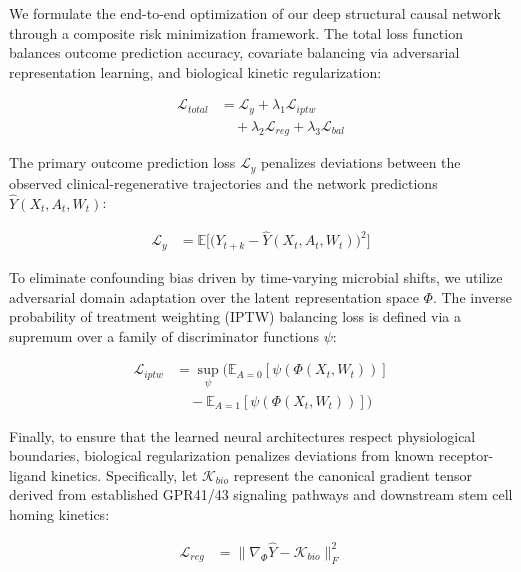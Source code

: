 \documentclass[10pt,twocolumn]{article}
\begin{document}
We formulate the end-to-end optimization of our deep structural causal network through a composite risk minimization framework. The total loss function balances outcome prediction accuracy, covariate balancing via adversarial representation learning, and biological kinetic regularization:

\begin{equation}
\begin{aligned}
\mathcal{L}_{total} &= \mathcal{L}_{y} + \lambda_1 \mathcal{L}_{iptw} \\
&\quad + \lambda_2 \mathcal{L}_{reg} + \lambda_3 \mathcal{L}_{bal}
\end{aligned}
\end{equation}

The primary outcome prediction loss $\mathcal{L}_{y}$ penalizes deviations between the observed clinical-regenerative trajectories and the network predictions $\hat{Y}(X_t, A_t, W_t)$:

\begin{equation}
\begin{aligned}
\mathcal{L}_{y} &= \mathbb{E} \Big[ \Big( Y_{t+k} - \hat{Y}(X_t, A_t, W_t) \Big)^2 \Big]
\end{aligned}
\end{equation}

To eliminate confounding bias driven by time-varying microbial shifts, we utilize adversarial domain adaptation over the latent representation space $\Phi$. The inverse probability of treatment weighting (IPTW) balancing loss is defined via a supremum over a family of discriminator functions $\psi$:

\begin{equation}
\begin{aligned}
\mathcal{L}_{iptw} &= \sup_{\psi} \Big( \mathbb{E}_{A=0} [\psi(\Phi(X_t, W_t))] \\
&\quad - \mathbb{E}_{A=1} [\psi(\Phi(X_t, W_t))] \Big)
\end{aligned}
\end{equation}

Finally, to ensure that the learned neural architectures respect physiological boundaries, biological regularization penalizes deviations from known receptor-ligand kinetics. Specifically, let $\mathcal{K}_{bio}$ represent the canonical gradient tensor derived from established GPR41/43 signaling pathways and downstream stem cell homing kinetics:

\begin{equation}
\begin{aligned}
\mathcal{L}_{reg} &= \| \nabla_{\Phi} \hat{Y} - \mathcal{K}_{bio} \|_F^2
\end{aligned}
\end{equation}
\end{document}
